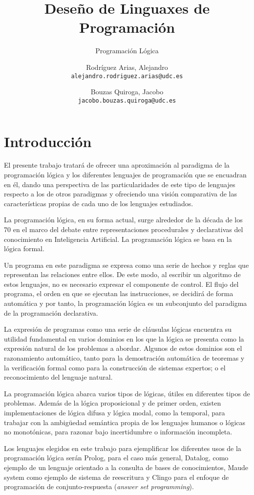 \documentclass[11pt,captions=nooneline,DIV=14, parskip=full]{scrartcl}
\title{Deseño de Linguaxes de Programación}
\subtitle{Programación Lógica}
\author{Rodríguez Arias, Alejandro\\
	\texttt{alejandro.rodriguez.arias@udc.es}
	\and Bouzas Quiroga, Jacobo\\
	\texttt{jacobo.bouzas.quiroga@udc.es}}
\date{\displaydate{release}}
\begin{document}
\maketitle
\clearpage
\tableofcontents
\clearpage

\section{Introducción}
\label{sec:intro}

El presente trabajo tratará de ofrecer una aproximación al paradigma de la programación lógica y los diferentes lenguajes de programación que se encuadran en él, dando una perspectiva de las particularidades de este tipo de lenguajes respecto a los de otros paradigmas y ofreciendo una visión comparativa de las características propias de cada uno de los lenguajes estudiados.

La programación lógica, en su forma actual, surge alrededor de la década de los 70 en el marco del debate entre representaciones procedurales y declarativas del conocimiento en Inteligencia Artificial. La programación lógica se basa en la lógica formal.

Un programa en este paradigma se expresa como una serie de hechos y reglas que representan las relaciones entre ellos. De este modo, al escribir un algoritmo de estos lenguajes, no es necesario expresar el componente de control. El flujo del programa, el orden en que se ejecutan las instrucciones, se decidirá de forma automática y por tanto, la programación lógica es un subconjunto del paradigma de la programación declarativa.

La expresión de programas como una serie de cláusulas lógicas encuentra su utilidad fundamental en varios dominios en los que la lógica se presenta como la expresión natural de los problemas a abordar. Algunos de estos dominios son el razonamiento automático, tanto para la demostración automática de teoremas y la verificación formal como para la construcción de sistemas expertos; o el reconocimiento del lenguaje natural.

La programación lógica abarca varios tipos de lógicas, útiles en diferentes tipos de problemas. Además de la lógica proposicional y de primer orden, existen implementaciones de lógica difusa y lógica modal, como la temporal, para trabajar con la ambigüedad semántica propia de los lenguajes humanos o lógicas no monotónicas, para razonar bajo incertidumbre o información incompleta.

Los lenguajes elegidos en este trabajo para ejemplificar los diferentes usos de la programación lógica serán Prolog, para el caso más general, Datalog, como ejemplo de un lenguaje orientado a la consulta de bases de conocimientos, Maude system como ejemplo de sistema de reescritura y Clingo para el enfoque de programación de conjunto-respuesta (\textit{answer set programming}).
\end{document}
